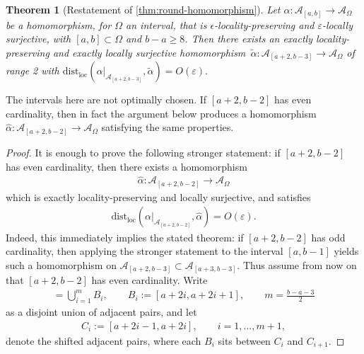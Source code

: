 \documentclass[11pt,reqno]{amsart}
\newtheorem*{theorem*}{Theorem}
\theoremstyle{definition}
\theoremstyle{remark}
\numberwithin{equation}{section}
\newcommand{\eps}{\varepsilon}
\newcommand{\cA}{\mathcal A}
\newcommand{\distloc}{\mathrm{dist}_\mathrm{loc}}
\begin{document}
\begin{theorem*}[Restatement of \cref{thm:round-homomorphism}]
    Let $\alpha : \cA_{[a,b]} \to \cA_\Omega$ be a homomorphism, for $\Omega$ an interval, that is $\epsilon$-locality-preserving and $\eps$-locally surjective, with $[a,b] \subset \Omega$ and $b-a \geq 8$.
    Then there exists an exactly locality-preserving and exactly locally surjective homomorphism~$\tilde{\alpha} : \cA_{[a+2,b-3]} \to \cA_\Omega$ of range 2 with $\distloc(\alpha|_{\cA_{[a+2,b-3]}},\tilde \alpha) = O(\eps).$
\end{theorem*}
The intervals here are not optimally chosen.  If $[a+2,b-2]$ has even cardinality, then in fact the argument below produces a homomorphism $\hat{\alpha} : \cA_{[a+2,b-2]} \to \cA_\Omega$ satisfying the same properties.
\begin{proof}
It is enough to prove the following stronger statement: if $[a+2,b-2]$ has even cardinality, then there exists a homomorphism
\begin{align*}
    \hat{\alpha} : \cA_{[a+2,b-2]} \to \cA_\Omega
\end{align*}
which is exactly locality-preserving and locally surjective, and satisfies
\begin{align*}
    \distloc(\alpha|_{\cA_{[a+2,b-2]}},\hat{\alpha}) = O(\eps).
\end{align*}
Indeed, this immediately implies the stated theorem:
if $[a+2,b-2]$ has odd cardinality, then applying the stronger statement to the interval $[a,b-1]$ yields such a homomorphism on $\cA_{[a+2,b-3]} \subset \cA_{[a+3,b-3]}$.
Thus assume from now on that $[a+2,b-2]$ has even cardinality.  Write
\begin{align*}
    [a+2,b-2] = \bigcup_{i=1}^m B_i, \qquad B_i := [a+2i,a+2i+1], \qquad m = \frac{b-a-3}{2}
\end{align*}
as a disjoint union of adjacent pairs, and let
\begin{align*}
    C_i := [a+2i-1,a+2i], \qquad i=1,\ldots,m+1,
\end{align*}
denote the shifted adjacent pairs, where each $B_i$ sits between $C_i$ and $C_{i+1}$.


\end{proof}
\end{document}
